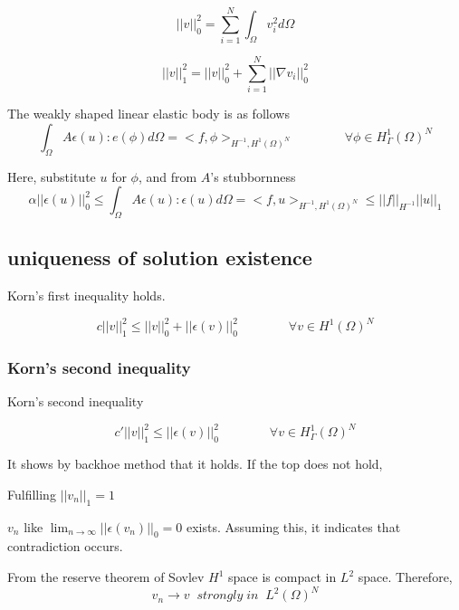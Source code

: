 \begin{equation}
||v||^2_0=\sum_{i=1}^N \int_\Omega v_i^2 d\Omega
\end{equation}

\begin{equation}
||v||^2_1=||v||^2_0+\sum_{i=1}^N||\nabla v_i||^2_0
\end{equation}


The weakly shaped linear elastic body is as follows
\begin{equation}
\int_{\Omega} A \epsilon(u):e(\phi)d\Omega = <f,\phi>_{H^{-1},H^1(\Omega)^N}\qquad\qquad\forall\phi\in H^1_\Gamma(\Omega)^N
\end{equation}


Here, substitute $u$ for $\phi$, and from $A$'s stubbornness
\begin{equation}
\alpha||\epsilon(u)||^2_0\le\int_{\Omega} A \epsilon(u):\epsilon(u)d\Omega = <f,u>_{H^{-1},H^1(\Omega)^N} \le ||f||_{H^{-1}} ||u||_1
\end{equation}


\subsection{uniqueness of solution existence}


Korn's first inequality holds.

\begin{equation}
c||v||^2_1\le ||v||^2_0+||\epsilon(v)||^2_0\qquad\qquad\forall v\in H^1(\Omega)^N
\end{equation}


\subsubsection{Korn's second inequality}


Korn's second inequality

\begin{equation}
c'||v||^2_1\le ||\epsilon(v)||^2_0\qquad\qquad\forall v\in H^1_{\Gamma}(\Omega)^N
\end{equation}


It shows by backhoe method that it holds. If the top does not hold,

Fulfilling $||v_n||_1 = 1$

$v_n$ like $\lim_{n\rightarrow \infty}||\epsilon(v_n)||_0=0$ exists. Assuming this, it indicates that contradiction occurs.

From the reserve theorem of Sovlev $H^1$ space is compact in $L^2$ space. Therefore,
\begin{equation}
v_n \rightarrow v \;\;strongly\;in\;\; L^2(\Omega)^N
\end{equation}


